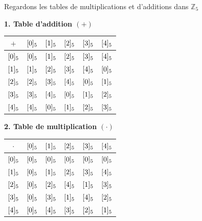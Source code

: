 \begin{exemple}
	Regardons les tables de multiplications et d'additions dans $\mathbb{Z}_5$
	
	\begin{minipage}[t]{0.48\linewidth}
		\vspace{0pt} %
		\centering
		\textbf{1. Table d'addition $(+)$}
		\vspace{0.3cm}
		
		\renewcommand{\arraystretch}{1.3}
		\begin{tabular}{c|ccccc}
			$+$ & $\cl[5]{0}$ & $\cl[5]{1}$ & $\cl[5]{2}$ & $\cl[5]{3}$ & $\cl[5]{4}$ \\ \hline
			$\cl[5]{0}$ & $\cl[5]{0}$ & $\cl[5]{1}$ & $\cl[5]{2}$ & $\cl[5]{3}$ & $\cl[5]{4}$ \\
			$\cl[5]{1}$ & $\cl[5]{1}$ & $\cl[5]{2}$ & $\cl[5]{3}$ & $\cl[5]{4}$ & $\cl[5]{0}$ \\
			$\cl[5]{2}$ & $\cl[5]{2}$ & $\cl[5]{3}$ & $\cl[5]{4}$ & $\cl[5]{0}$ & $\cl[5]{1}$ \\
			$\cl[5]{3}$ & $\cl[5]{3}$ & $\cl[5]{4}$ & $\cl[5]{0}$ & $\cl[5]{1}$ & $\cl[5]{2}$ \\
			$\cl[5]{4}$ & $\cl[5]{4}$ & $\cl[5]{0}$ & $\cl[5]{1}$ & $\cl[5]{2}$ & $\cl[5]{3}$ \\
		\end{tabular}
	\end{minipage}%
	\hfill
	\begin{minipage}[t]{0.48\linewidth}
		\vspace{0pt} %
		\centering
		\textbf{2. Table de multiplication $(\cdot)$}
		\vspace{0.3cm}
		
		\renewcommand{\arraystretch}{1.3}
		\begin{tabular}{c|ccccc}
			$\cdot$ & $\cl[5]{0}$ & $\cl[5]{1}$ & $\cl[5]{2}$ & $\cl[5]{3}$ & $\cl[5]{4}$ \\ \hline
			$\cl[5]{0}$ & $\cl[5]{0}$ & $\cl[5]{0}$ & $\cl[5]{0}$ & $\cl[5]{0}$ & $\cl[5]{0}$ \\
			$\cl[5]{1}$ & $\cl[5]{0}$ & $\cl[5]{1}$ & $\cl[5]{2}$ & $\cl[5]{3}$ & $\cl[5]{4}$ \\
			$\cl[5]{2}$ & $\cl[5]{0}$ & $\cl[5]{2}$ & $\cl[5]{4}$ & $\cl[5]{1}$ & $\cl[5]{3}$ \\
			$\cl[5]{3}$ & $\cl[5]{0}$ & $\cl[5]{3}$ & $\cl[5]{1}$ & $\cl[5]{4}$ & $\cl[5]{2}$ \\
			$\cl[5]{4}$ & $\cl[5]{0}$ & $\cl[5]{4}$ & $\cl[5]{3}$ & $\cl[5]{2}$ & $\cl[5]{1}$ \\
		\end{tabular}
	\end{minipage}
\end{exemple}

